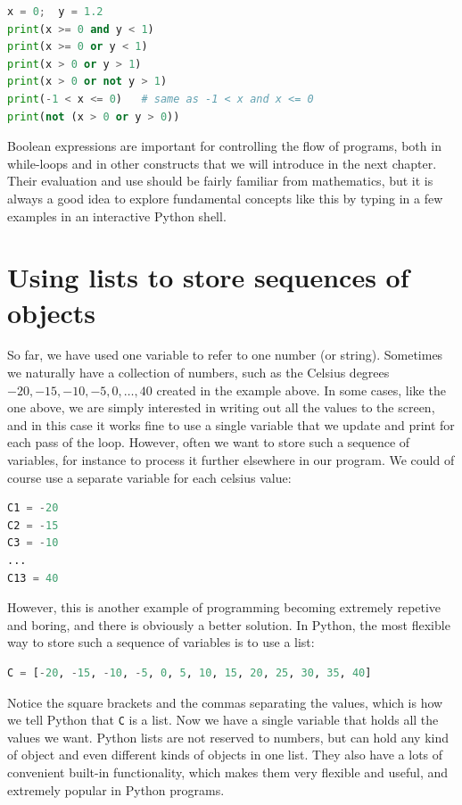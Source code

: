 \documentclass[graybox,envcountchap,sectrefs,final]{svmonodo}
\begin{document}
\begin{lstlisting}[language=Python,style=blue1]
x = 0;  y = 1.2
print(x >= 0 and y < 1)
print(x >= 0 or y < 1)
print(x > 0 or y > 1)
print(x > 0 or not y > 1)
print(-1 < x <= 0)   # same as -1 < x and x <= 0
print(not (x > 0 or y > 0))
\end{lstlisting}
Boolean expressions are important for controlling the flow of programs, both in while-loops and in other constructs that we will
introduce in the next chapter. Their evaluation and use should be fairly familiar from mathematics, but it is always a good
idea to explore fundamental concepts like this by typing in a few examples in an interactive Python shell.


\section{Using lists to store sequences of objects}
So far, we have used one variable to refer to one number (or string).
Sometimes we naturally have a collection of numbers, such as the Celsius degrees $-20, -15, -10, -5, 0, \ldots, 40$ created
in the example above. In some cases, like the one above, we are simply interested in writing out all the values to the
screen, and in this case it works fine to use a single variable that we update and print for each pass of the loop. However,
often we want to store such a sequence of variables, for instance to process it further elsewhere in our program. We could of course
use a separate variable for each celsius value:
\begin{lstlisting}[language=Python,style=blue1]
C1 = -20
C2 = -15
C3 = -10
...
C13 = 40
\end{lstlisting}
However, this is another example of programming becoming extremely repetive and boring, and there is obviously
a better solution. In Python, the most flexible way to store such a sequence of variables is to use a list:
\begin{lstlisting}[language=Python,style=blue1]
C = [-20, -15, -10, -5, 0, 5, 10, 15, 20, 25, 30, 35, 40]
\end{lstlisting}
Notice the square brackets and the commas separating the values, which is how we tell Python that \texttt{C} is a list.
Now we have a single variable that holds all the values we want. Python lists are not reserved to numbers, but can hold
any kind of object and even different kinds of objects in one list. They also have a lots of convenient built-in functionality,
which makes them very flexible and useful, and extremely popular in Python programs.
\end{document}
